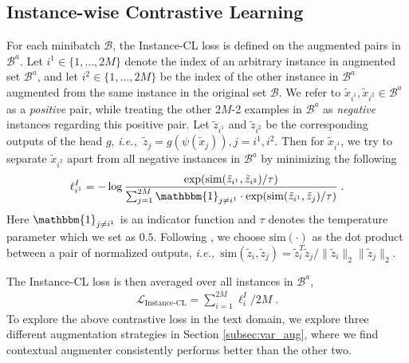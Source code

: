 \documentclass[11pt]{article}
\def\ie{{\em i.e.,~}}
\begin{document}
\subsection{Instance-wise Contrastive Learning}
\label{subsec:Instance-CL}
For each minibatch $\mathcal{B}$, the Instance-CL loss is defined on the augmented pairs in $\mathcal{B}^a$. Let $i^1\in\{1,\dots,2M\}$ denote the index of an arbitrary instance in augmented set $\mathcal{B}^a$, and let $i^2\in\{1,\dots,2M\}$ be the index of the other instance in $\mathcal{B}^a$ augmented from the same instance in the original set $\mathcal{B}$. We refer to $\tilde{x}_{i^1}, \tilde{x}_{i^2}\in\mathcal{B}^a$ as a \textit{positive} pair, while treating the other $2M$-2 examples in $\mathcal{B}^a$ as \textit{negative} instances regarding this positive pair. Let $\tilde{z}_{i^1}$ and $\tilde{z}_{i^{2}}$ be the corresponding outputs of the head $g$, \ie $\tilde{z}_{j}=g(\psi(\tilde{x}_j)), j=i^1, i^2$. Then for $\tilde{x}_{i^1}$, we try to separate $\tilde{x}_{i^2}$ apart from all negative instances in $\mathcal{B}^a$ by minimizing the following
\begin{align}
    \ell_{i^1}^{I} = -\log\frac{\exp(\text{sim}(\tilde{z}_{i^1}, \tilde{z}_{i^2})/\tau)}{\sum_{j=1}^{2M}\mathbbm{1}_{j\neq i^1} \cdot \exp(\text{sim}(\tilde{z}_{i^1}, \tilde{z}_j)/\tau)}\;. 
\end{align}
Here $\mathbbm{1}_{j\neq i^1}$ is an indicator function and $\tau$ denotes the temperature parameter which we set as $0.5$.
Following \citet{chen2020simple}, we choose $\text{sim}(\cdot)$ as the dot product between a pair of normalized outputs, \ie $\text{sim}(\tilde{z}_i, \tilde{z}_j) = \tilde{z}_i^T\tilde{z}_j / \|\tilde{z}_i\|_2 \|\tilde{z}_j\|_2$. 

The Instance-CL loss is then averaged over all instances in $\mathcal{B}^a$, 
\begin{align}
    \mathcal{L}_{\text{Instance-CL}} = \sum_{i=1}^{2M} \ell_{i}^{I} /2M \;.
    \label{eq:instance-CL}
\end{align}
To explore the above contrastive loss in the text domain, we explore three different augmentation strategies in Section \ref{subsec:var_aug}, where we find contextual augmenter  \citep{kobayashi2018contextual,ma2019nlpaug} consistently performs better than the other two.  
\end{document}

